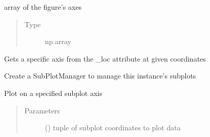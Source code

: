 \documentclass[letterpaper,10pt,english]{sphinxmanual}
\begin{document}
\begin{fulllineitems}
\begin{fulllineitems}
\end{fulllineitems}


\begin{fulllineitems}
\label{\detokenize{dalio.external:dalio.external.image.PySubplotGraph._loc}}
array of the figure’s axes
\begin{quote}\begin{description}
\item[{Type}] \leavevmode
np.array

\end{description}\end{quote}

\end{fulllineitems}


\begin{fulllineitems}
\label{\detokenize{dalio.external:dalio.external.image.PySubplotGraph.get_loc}}
Gets a specific axis from the \_loc attribute at given
coordinates

\end{fulllineitems}


\begin{fulllineitems}
\label{\detokenize{dalio.external:dalio.external.image.PySubplotGraph.make_manager}}
Create a SubPlotManager to manage this instance’s subplots

\end{fulllineitems}


\begin{fulllineitems}
\label{\detokenize{dalio.external:dalio.external.image.PySubplotGraph.plot}}
Plot on a specified subplot axis
\begin{quote}\begin{description}
\item[{Parameters}] \leavevmode
{} () \textendash{} tuple of subplot coordinates to plot data


\end{description}
\end{quote}
\end{fulllineitems}
\end{fulllineitems}
\end{document}
